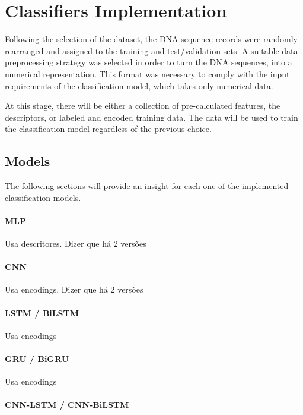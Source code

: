 \section{Classifiers Implementation}

Following the selection of the dataset, the \gls{DNA} sequence records were randomly rearranged and assigned to the training and test/validation sets. A suitable data preprocessing strategy was selected in order to turn the \gls{DNA} sequences, into a numerical representation. This format was necessary to comply with the input requirements of the classification model, which takes only numerical data.

At this stage, there will be either a collection of pre-calculated features, the descriptors, or labeled and encoded training data. The data will be used to train the classification model regardless of the previous choice.

\subsection{Models}

The following sections will provide an insight for each one of the implemented classification models.

\paragraph{MLP}

Usa descritores. Dizer que há 2 versões 

\paragraph{CNN}

Usa encodings. Dizer que há 2 versões 

\paragraph{LSTM / BiLSTM}

Usa encodings

\paragraph{GRU / BiGRU}

Usa encodings

\paragraph{CNN-LSTM / CNN-BiLSTM}

